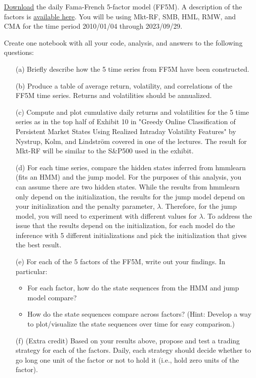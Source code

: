 \documentclass[11pt]{article}
\theoremstyle{plain} %
\theoremstyle{remark}
\begin{document}
\href{https://mba.tuck.dartmouth.edu/pages/faculty/ken.french/ftp/F-F_Research_Data_5_Factors_2x3_daily_CSV.zip}{Download}
the daily Fama-French 5-factor model (FF5M). A description of the factors is
\href{https://mba.tuck.dartmouth.edu/pages/faculty/ken.french/Data_Library/f-f_5_factors_2x3.html}{available
here}. You will be using Mkt-RF, SMB, HML, RMW, and CMA for the time period
2010/01/04 through 2023/09/29.

Create one notebook with all your code, analysis, and answers to the following
questions:

\begin{enumerate}
  \item[(a)] Briefly describe how the 5 time series from FF5M have been
  constructed.
  
  \item[(b)] Produce a table of average return, volatility, and correlations of
  the FF5M time series. Returns and volatilities should be annualized.
  
  \item[(c)] Compute and plot cumulative daily returns and volatilities for the
  5 time series as in the top half of Exhibit 10 in "Greedy Online
  Classification of Persistent Market States Using Realized Intraday Volatility
  Features" by Nystrup, Kolm, and Lindström covered in one of the lectures. The
  result for Mkt-RF will be similar to the S\&P500 used in the exhibit.
  
  \item[(d)] For each time series, compare the hidden states inferred from
  hmmlearn (fits an HMM) and the jump model. For the purposes of this analysis,
  you can assume there are two hidden states. While the results from hmmlearn
  only depend on the initialization, the results for the jump model depend on
  your initialization and the penalty parameter, \(\lambda\). Therefore, for the
  jump model, you will need to experiment with different values for \(\lambda\).
  To address the issue that the results depend on the initialization, for each
  model do the inference with 5 different initializations and pick the
  initialization that gives the best result.
  
  \item[(e)] For each of the 5 factors of the FF5M, write out your findings. In
  particular: 
  \begin{itemize}
    \item For each factor, how do the state sequences from the HMM and jump
    model compare?
    \item How do the state sequences compare across factors? (Hint: Develop a
    way to plot/visualize the state sequences over time for easy comparison.)
  \end{itemize}
  
  \item[(f)] (Extra credit) Based on your results above, propose and test a
  trading strategy for each of the factors. Daily, each strategy should decide
  whether to go long one unit of the factor or not to hold it (i.e., hold zero
  units of the factor).
\end{enumerate}
\end{document}

